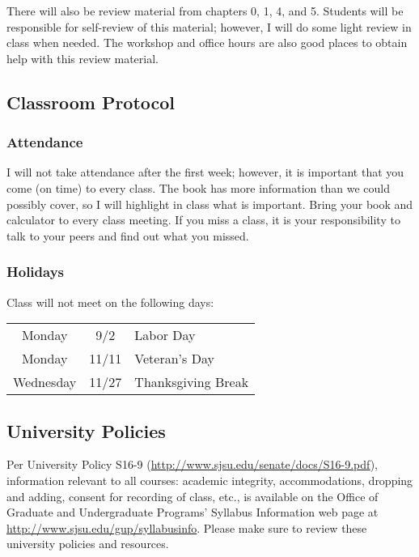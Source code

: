 \documentclass[letterpaper,12pt,fleqn]{article}
\begin{document}
There will also be review material from chapters 0, 1, 4, and 5.  Students will be responsible for self-review of
this material; however, I will do some light review in class when needed.  The workshop and office hours are also
good places to obtain help with this review material.

\subsection*{Classroom Protocol}
  
\subsubsection*{Attendance}

I will not take attendance after the first week; however, it is important that you come (on time) to every
class. The book has more information than we could possibly cover, so I will highlight in class what is
important. Bring your book and calculator to every class meeting. If you miss a class, it is your responsibility to
talk to your peers and find out what you missed.

\subsubsection*{Holidays}

Class will not meet on the following days:

\begin{tabular}{ccl}
  Monday & 9/2 & Labor Day \\
  Monday & 11/11 & Veteran's Day \\
  Wednesday & 11/27 & Thanksgiving Break
\end{tabular}

\subsection*{University Policies}

Per University Policy S16-9 (\url{http://www.sjsu.edu/senate/docs/S16-9.pdf}), information relevant to all courses:
academic integrity, accommodations, dropping and adding, consent for recording of class, etc., is available on the
Office of Graduate and Undergraduate Programs’ Syllabus Information web page at
\url{http://www.sjsu.edu/gup/syllabusinfo}.  Please make sure to review these university policies and resources.
\end{document}
